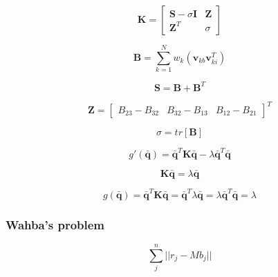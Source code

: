 \documentclass[12pt,a4paper,oneside]{article}
\begin{document}
\begin{equation}
\bm{K} = \begin{bmatrix}
\bm{S} - \sigma\bm{I} & \bm{Z} \\
\bm{Z}^T & \sigma
\end{bmatrix}
\end{equation}

\begin{equation}
\bm{B} = \sum_{k=1}^Nw_k(\bm{v}_{kb}\bm{v}_{ki}^T)
\end{equation}

\begin{equation}
\bm{S} = \bm{B} + \bm{B}^T
\end{equation}

\begin{equation}
\bm{Z} = \begin{bmatrix}
B_{23} - B_{32} & B_{32} - B_{13} & B_{12} - B_{21}
\end{bmatrix} ^T
\end{equation}

\begin{equation}
\sigma = tr[\bm{B}]
\end{equation}

\begin{equation}
g'(\bm{\bar{q}}) = \bm{\bar{q}}^T\bm{K}\bm{\bar{q}} - \lambda\bm{\bar{q}}^T\bm{\bar{q}}
\end{equation}

\begin{equation}
\bm{K}\bm{\bar{q}} = \lambda\bm{\bar{q}}
\end{equation}

\begin{equation}
g(\bm{\bar{q}}) = \bm{\bar{q}}^T\bm{K}\bm{\bar{q}} = \bm{\bar{q}}^T\lambda\bm{\bar{q}} = \lambda\bm{\bar{q}}^T\bm{\bar{q}} = \lambda
\end{equation}

\subsubsection{Wahba's problem}
\cite{wahba1965least}

\begin{equation}
\sum_j^n ||r_j - Mb_j||
\end{equation}
\end{document}
